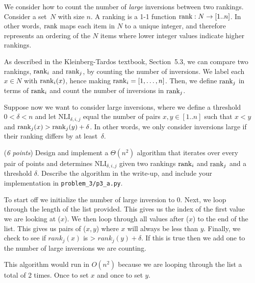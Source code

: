 \documentclass{hw}
\begin{document}
\newcommand{\rank}{\textnormal{rank}}
\newcommand{\Colon}{:}
\newcommand{\dotdot}{..}
\newcommand{\numinv}{\textrm{NI}}
\newcommand{\numlargeinv}{\textrm{NLI}}

\begin{problem}
  We consider how to count the number of \emph{large} inversions between two
  rankings. Consider a set~$N$ with size $n$. 
  A ranking is a 1-1 function $\rank\Colon N
  \rightarrow [1\dotdot n]$. In other words, $\rank$ maps each item in $N$ to a unique
  integer, and therefore represents an ordering of the $N$ items where lower
  integer values indicate higher rankings. 

  As described in the Kleinberg-Tardos textbook, Section~5.3, we can compare two rankings, $\rank_i$ and $\rank_j$, by counting the number of
  inversions. We label each $x \in N$ with $\rank_i(x)$, hence making $\rank_i = [1, \dots ,n]$. Then, we define $\rank_j$ in terms of $\rank_i$ and count the number of inversions in $\rank_j$. 

  Suppose now we want to consider large inversions, where we define a threshold
  $0 < \delta < n$ and let $\numlargeinv_{\delta,i,j}$ equal the number of pairs
  $x,y \in [1\dotdot n]$ such that $x < y$ and $\rank_j(x) > \rank_j(y) + \delta$. In other words, we only consider inversions large if their ranking differs by at
  least~$\delta$.
  \begin{subproblem}
    (\textit{6 points})
    Design and implement a $\Theta(n^2)$ algorithm that iterates over every pair
    of points and determines $\numlargeinv_{\delta,i,j}$ given two rankings
    $\rank_i$ and $\rank_j$ and a threshold $\delta$. Describe the algorithm in the write-up, and include your implementation in \texttt{problem\_3/p3\_a.py}.
  \end{subproblem}

        \begin{solution}
            To start off we initialize the number of large inversion to 0. Next, we loop through the length of the list provided. This gives us the index of the first value we are looking at ($x$). We then loop through all values after ($x$) to the end of the list. This gives us pairs of ($x,y$) where $x$ will always be less than $y$. Finally, we check to see if $rank_j(x)$ is > $rank_j(y) + \delta$. If this is true then we add one to the number of large inversions we are counting.

            This algorithm would run in $O(n^2)$ because we are looping through the list a total of 2 times. Once to set $x$ and once to set $y$.
        \end{solution}


\end{problem}
\end{document}
